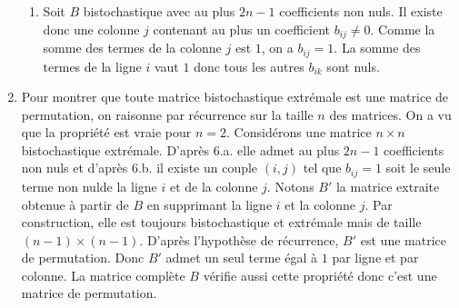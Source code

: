 \begin{enumerate}
\begin{enumerate}
  \item Soit $B$ bistochastique avec au plus $2n -1$ coefficients non nuls. Il existe donc une colonne $j$ contenant au plus un coefficient $b_{i j} \neq 0$. Comme la somme des termes de la colonne $j$ est $1$, on a $b_{i j} = 1$. La somme des termes de la ligne $i$ vaut $1$ donc tous les autres $b_{i k}$ sont nuls.
 \end{enumerate}

 \item Pour montrer que toute matrice bistochastique extrémale est une matrice de permutation, on raisonne par récurrence sur la taille $n$ des matrices. On a vu que la propriété est vraie pour $n=2$.\newline
 Considérons une matrice $n\times n$ bistochastique extrémale. D'après 6.a. elle admet au plus $2n-1$ coefficients non nuls et d'après 6.b. il existe un couple $(i,j)$ tel que $b_{i j}=1$ soit le seule terme non nulde la ligne $i$ et de la colonne $j$.\newline
 Notons $B'$ la matrice extraite obtenue à partir de $B$ en supprimant la ligne $i$ et la colonne $j$. Par construction, elle est toujours bistochastique et extrémale mais de taille $(n-1)\times(n-1)$. D'après l'hypothèse de récurrence, $B'$ est une matrice de permutation. Donc $B'$ admet un seul terme égal à $1$ par ligne et par colonne. La matrice complète $B$ vérifie aussi cette propriété donc c'est une matrice de permutation.
\end{enumerate}

